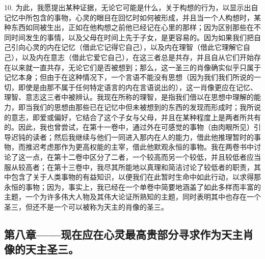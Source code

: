 10. 为此，我愿提出某种证据，无论它可能是什么，关于构想的行为，以显示出自记忆中所包含的事物，心灵的眼目在回忆时如何被形成，并且当一个人构想时，某种东西如同被生出，正如在他构想之前他已经记在心里的那样；因为区别那些在不同时间发生的事情，以及父母在时间上先于子女，是更容易的。因为如果我们把自己引向心灵的内在记忆（借此它记得它自己），以及内在理智（借此它理解它自己），以及内在意志（借此它爱它自己），在这三者总是共存，并且自从它们开始存在以来就一直共存，无论它们是否被想到；那么，这一圣三的肖像确实似乎只属于记忆本身；但由于在这种情况下，一个言语不能没有思想（因为我们我们所说的一切，即使是由那不属于任何特定语言的内在言语说出的），这一肖像更应在记忆、理智、意志这三者中被辨认。我现在所称的理智，是指我们借以在思想中理解的能力，即当我们的思想由那些已在记忆中但未被想到的东西的发现而形成时；我所说的意志，即爱或偏好，它结合了这个子女与父母，并且在某种程度上是两者所共有的。因此，我也曾尝试，在第十一卷中，通过外在可感觉的事物（由肉眼所见）引导迟钝的读者；然后我继续与他们一同进入那内在人的能力，借此他推理暂时的事物，而推迟考虑那作为更高权能的主宰，借此他默观永恒的事物。我在两卷书中讨论了这一点，在第十二卷中区分了二者，一个较高而另一个较低，并且较低者应当服从较高者；在第十三卷中，我尽其所能地以真理和简洁讨论了较低者的职责，其中包含了关于人类事物的有益知识，以便我们在此暂时生命中如此行动，以求得那永恒的事物；因为，事实上，我已经在一个单卷中简要地涵盖了如此多样而丰富的主题，一个为许多伟大人物及其伟大论证所熟知的主题，同时表明其中也存在一个圣三，但还不是一个可以被称为天主的肖像的圣三。\par


\subsection{第八章——现在应在心灵最高贵部分寻求作为天主肖像的天主圣三。}


